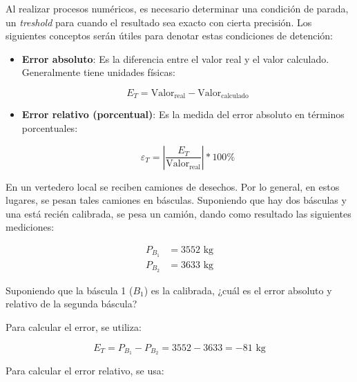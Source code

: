 Al realizar procesos numéricos, es necesario determinar una condición de
parada, un \emph{treshold} para cuando el resultado sea exacto con
cierta precisión. Los siguientes conceptos serán útiles para denotar
estas condiciones de detención:

\begin{itemize}
    \item
        \textbf{Error absoluto}: Es la diferencia entre el valor real y el
        valor calculado. Generalmente tiene unidades físicas:

        \begin{equation}{
                E_T = \text{Valor}_{\text{real}} - \text{Valor}_{\text{calculado}}
        }\end{equation}
    \item
        \textbf{Error relativo (porcentual)}: Es la medida del error absoluto
        en términos porcentuales:

        \begin{equation}{
                \varepsilon_{T} = \left| {\frac{E_T}{\text{Valor}_{\text{real}}}} \right| * 100 \%
        }\end{equation}
\end{itemize}


\begin{ex}

    En un vertedero local se reciben camiones de desechos. Por lo general,
    en estos lugares, se pesan tales camiones en básculas. Suponiendo que
    hay dos básculas y una está recién calibrada, se pesa un camión, dando
    como resultado las siguientes mediciones:

    \begin{eqnarray*}
        P_{B_1} &= 3552\text{ kg}\\
        P_{B_2} &= 3633\text{ kg}
    \end{eqnarray*}

    Suponiendo que la báscula 1 (\(B_1\)) es la calibrada, ¿cuál es el error
    absoluto y relativo de la segunda báscula?

    \begin{solution}
        Para calcular el error, se utiliza:

        \begin{equation}{
                E_T = P_{B_1} - P_{B_2} = 3552 - 3633 = -81 \text{ kg}
        }\end{equation}

        Para calcular el error relativo, se usa:

        \begin{center}
        \end{center}

    \end{solution}


\end{ex}


